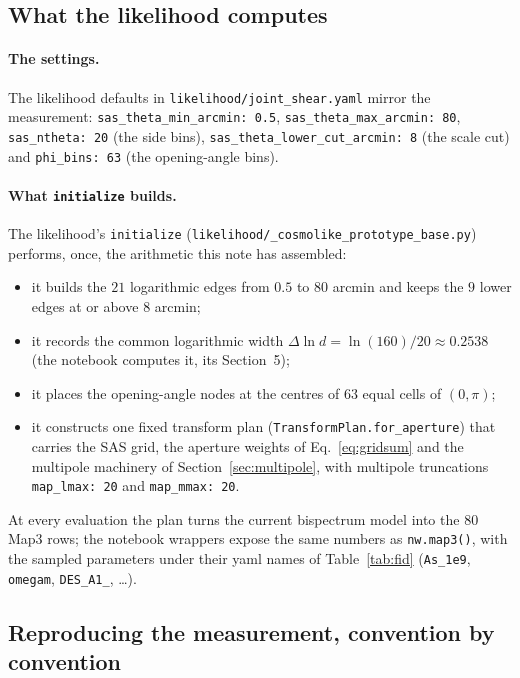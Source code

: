 \documentclass[11pt]{article}
\newcommand{\us}{\_\allowbreak}
\numberwithin{equation}{section}
\begin{document}
\subsection{What the likelihood computes}
\label{sec:likelihoodcalc}

\paragraph{The settings.}
The likelihood defaults in \texttt{likelihood/joint\us shear.yaml}
mirror the measurement:
\texttt{sas\us theta\us min\us arcmin: 0.5},
\texttt{sas\us theta\us max\us arcmin: 80},
\texttt{sas\us ntheta: 20} (the side bins),
\texttt{sas\us theta\us lower\us cut\us arcmin: 8} (the scale cut) and
\texttt{phi\us bins: 63} (the opening-angle bins).

\paragraph{What \texttt{initialize} builds.}
The likelihood's \texttt{initialize}
(\texttt{likelihood/\us cosmolike\us prototype\us base.py})
performs, once, the arithmetic this note has assembled:
\begin{itemize}
  \item it builds the $21$ logarithmic edges from $0.5$ to $80$
    arcmin and keeps the $9$ lower edges at or above $8$ arcmin;
  \item it records the common logarithmic width
    $\Delta\ln d = \ln(160)/20 \approx 0.2538$ (the notebook
    computes it, its Section~5);
  \item it places the opening-angle nodes at the centres of $63$
    equal cells of $(0, \pi)$;
  \item it constructs one fixed transform plan
    (\texttt{TransformPlan.for\us aperture}) that carries the SAS
    grid, the aperture weights of Eq.~\eqref{eq:gridsum} and the
    multipole machinery of Section~\ref{sec:multipole}, with
    multipole truncations \texttt{map\us lmax: 20} and
    \texttt{map\us mmax: 20}.
\end{itemize}
At every evaluation the plan turns the current bispectrum model into
the $80$ Map3 rows; the notebook wrappers expose the same numbers as
\texttt{nw.map3()}, with the sampled parameters under their yaml
names of Table~\ref{tab:fid} (\texttt{As\us 1e9},
\texttt{omegam}, \texttt{DES\us A1\us 1}, \ldots).

\subsection{Reproducing the measurement, convention by convention}
\label{sec:conventions}
\end{document}
